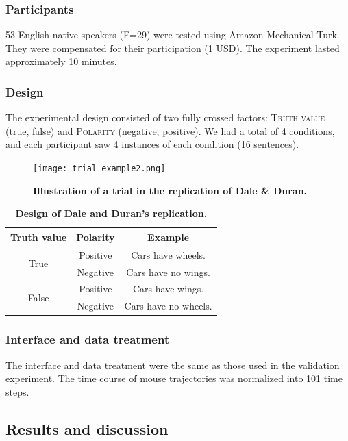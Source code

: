 \documentclass[11pt]{article}
\begin{document}
\subsubsection{Participants}
53 English native speakers (F=29) were tested using Amazon Mechanical Turk. They were compensated for their participation (1 USD). The experiment lasted approximately 10 minutes. 

\subsubsection{Design}
The experimental design consisted of two fully crossed factors: \textsc{Truth value} (true, false) and \textsc{Polarity} (negative, positive). We had a total of 4 conditions, and each participant saw 4 instances of each condition (16 sentences). 


\begin{figure}
\centering
\texttt{[image: trial\_example2.png]}
\caption{\textbf{Illustration of a trial in the replication of Dale \& Duran.}}
\end{figure}



\begin{table}[h]
\centering
\begin{tabular}{ccc}
Truth value & Polarity & Example \\
\hline
\multirow{2}{*}{True} & Positive & Cars have wheels.\\ 
 & Negative & Cars have no wings.\\ 
\hline
\multirow{2}{*}{False} & Positive & Cars have wings.\\ 
 & Negative & Cars have no wheels.\\
\end{tabular}
\caption{\textbf{Design of Dale and Duran's replication.}} \label{table:exampleDD}
\end{table}


\subsubsection{Interface and data treatment}
The interface and data treatment were the same as those used in the validation experiment. The time course of mouse trajectories was normalized into 101 time steps.

\subsection{Results and discussion}
\end{document}
